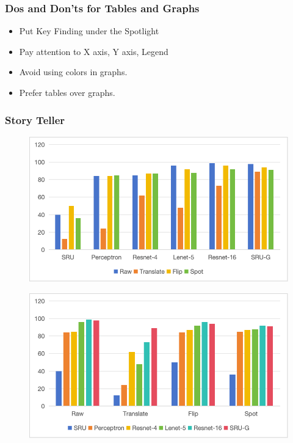 \documentclass{beamer}
\begin{document}
      \begin{frame}
      \frametitle{Dos and Don'ts for Tables and Graphs}
      \begin{itemize}[<+->]
          \item Put Key Finding under the Spotlight
          \item Pay attention to X axis, Y axis, Legend
          \item Avoid using colors in graphs.
          \item Prefer tables over graphs. 
      \end{itemize}
      \end{frame}

    \begin{frame}
      \frametitle{Story Teller}
      \begin{minipage}{0.48\textwidth}
          \begin{figure}
              \centering
              \includegraphics[width=\textwidth]{fig-1.png}
          \end{figure}
      \end{minipage}
      \hfill
      \begin{minipage}{0.48\textwidth}
          \begin{figure}
              \centering
              \includegraphics[width=\textwidth]{fig-2.png}
          \end{figure}
      \end{minipage}
  \end{frame}
  
\end{document}
